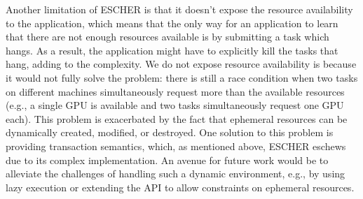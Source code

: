 Another limitation of ESCHER is that it doesn't expose the resource availability to the application, which means that the only way for an application to learn that there are not enough resources available is by submitting a task which hangs. As a result, the application might have to explicitly kill the tasks that hang, adding to the complexity. We do not expose resource availability is because it would not fully solve the problem: there is still a race condition when two tasks on different machines simultaneously request more than the available resources (e.g., a single GPU is available and two tasks simultaneously request one GPU each). This problem is exacerbated by the fact that ephemeral resources can be dynamically created, modified, or destroyed. One solution to this problem is providing transaction semantics, which, as mentioned above, ESCHER eschews due to its complex implementation. An avenue for future work would be to alleviate the challenges of handling such a dynamic environment, e.g., by using lazy execution or extending the API to allow constraints on ephemeral resources.




